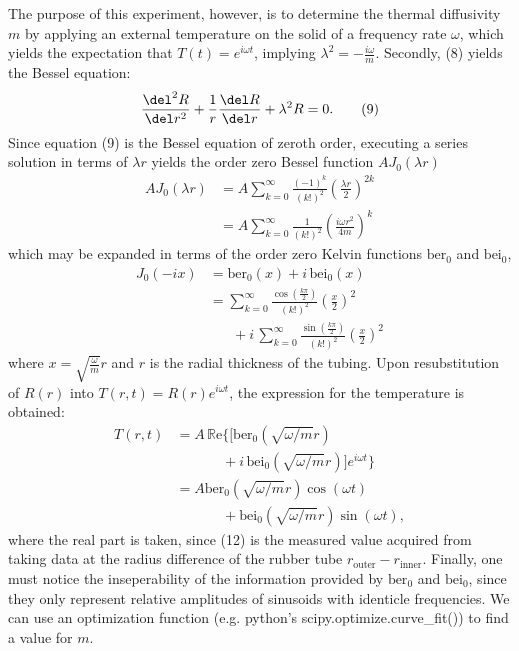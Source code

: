 \documentclass[11pt]{article}
\begin{document}
\begin{multicols}{2}
    The purpose of this experiment, however, is to determine the thermal diffusivity $m$ by applying an external temperature on the solid of a frequency rate $\omega$, which yields the expectation that $T(t) = e^{i\omega t}$, implying $\lambda^2 = -\frac{i\omega}{m}$. Secondly, (8) yields the Bessel equation:
    \[
        \frac{\del^2 R}{\del r^2} + \frac{1}{r}\frac{\del R}{\del r} + \lambda^2 R = 0. \tag{9}
    \]
    Since equation (9) is the Bessel equation of zeroth order, executing a series solution in terms of $\lambda r$ yields the order zero Bessel function $A J_0(\lambda r)$
    \begin{align*}
        AJ_0(\lambda r) &= A\sum_{k=0}^{\infty}\frac{(-1)^k}{(k!)^2}\left(\frac{\lambda r}{2}\right)^{2k} \tag{10.1}  \\
        &=A\sum_{k=0}^{\infty}\frac{1}{(k!)^2}\left(\frac{i\omega r^2}{4m}\right)^{k} \tag{10.2}
    \end{align*}
    \nd which may be expanded in terms of the order zero Kelvin functions $\text{ber}_0$ and $\text{bei}_0$, 
    \begin{align*}
        J_0(-ix) &= \text{ber}_0(x) + i\, \text{bei}_0(x) \tag{11.1}\\ 
        &= \sum_{k=0}^{\infty} \frac{\cos\left(\frac{k\pi}{2}\right)}{(k!)^2}\left(\frac{x}{2}\right)^2\\
        &\hspace{20pt}+ i\, \sum_{k=0}^{\infty} \frac{\sin\left(\frac{k\pi}{2}\right)}{(k!)^2}\left(\frac{x}{2}\right)^2\tag{11.2} 
    \end{align*}
    \nd where $x = \sqrt{\frac{\omega}{m}}r$ and $r$ is the radial thickness of the tubing. Upon resubstitution of $R(r)$ into $T(r,t) = R(r)e^{i\omega t}$, the expression for the temperature is obtained: 
   \begin{align*}
        T(r, t) &= A\, \mathbb{R}\text{e}\bigg\{\bigg[\text{ber}_0(\sqrt{\omega/m}r)\\
        &\hspace{40pt} + i\, \text{bei}_0(\sqrt{\omega/m}r)\bigg]e^{i\omega t}\bigg\} \\
        &=   A\text{ber}_0(\sqrt{\omega/m}r)\cos(\omega t) \\
        & \hspace{40pt} +  \text{bei}_0(\sqrt{\omega/m}r)\sin(\omega t),  \tag{12}
    \end{align*} 
    \nd where the real part is taken, since (12) is the measured value acquired from taking data at the radius difference of the rubber tube $r_{\text{outer}} - r_{\text{inner}}$. Finally, one must notice the inseperability of the information provided by $\text{ber}_0$ and $\text{bei}_0$, since they only represent relative amplitudes of sinusoids with identicle frequencies. We can use an optimization function (e.g. python's scipy.optimize.curve\_fit()) to find a value for $m$.




\end{multicols}
\end{document}
